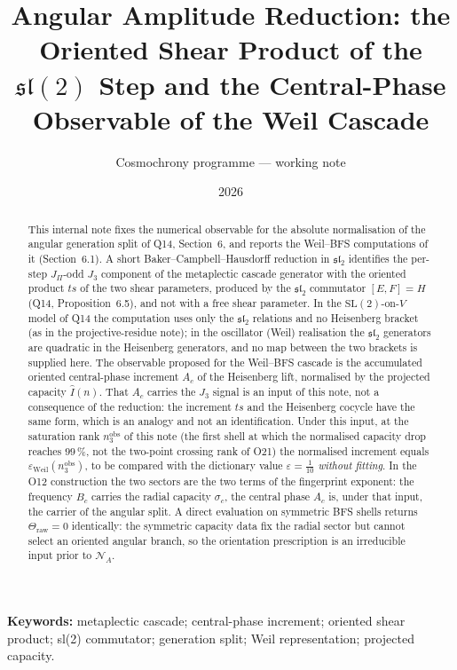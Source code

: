 \documentclass[11pt]{article}
\title{Angular Amplitude Reduction:
the Oriented Shear Product of the $\mathfrak{sl}(2)$ Step
and the Central-Phase Observable of the Weil Cascade}
\author{Cosmochrony programme --- working note}
\date{2026}
\providecommand{\Ihat}{\widehat{I}}
\begin{document}
  \maketitle

  \begin{abstract}
    This internal note fixes the numerical observable for the absolute normalisation of the angular
    generation split of Q14, Section~6, and reports the Weil--BFS computations of it
    (Section~6.1).
    A short Baker--Campbell--Hausdorff reduction in $\mathfrak{sl}_2$ identifies the per-step $J_\Pi$-odd $J_3$
    component of the metaplectic cascade generator with the oriented product $ts$ of the two shear parameters,
    produced by the $\mathfrak{sl}_2$ commutator $[E,F]=H$ (Q14, Proposition~6.5), and not with a free shear
    parameter.
    In the $\mathrm{SL}(2)$-on-$V$ model of Q14 the computation uses only the $\mathfrak{sl}_2$ relations and no
    Heisenberg bracket (as in the projective-residue note); in the oscillator (Weil) realisation the $\mathfrak{sl}_2$ generators are
    quadratic in the Heisenberg generators, and no map between the two brackets is supplied here.
    The observable proposed for the Weil--BFS cascade is the accumulated oriented central-phase increment
    $A_c$ of the Heisenberg lift, normalised by the projected capacity $\Ihat(n)$.
    That $A_c$ carries the $J_3$ signal is an input of this note, not a consequence of the reduction: the
    increment $ts$ and the Heisenberg cocycle have the same form, which is an analogy and not an identification.
    Under this input, at the saturation rank $n_3^{\mathrm{obs}}$ of this note (the first shell at which the
    normalised capacity drop reaches $99\,\%$, not the two-point crossing rank of O21) the normalised
    increment equals $\varepsilon_{\mathrm{Weil}}(n_3^{\mathrm{obs}})$, to be
    compared with the dictionary value $\varepsilon = \tfrac{1}{10}$ \emph{without fitting}.
    In the O12 construction the two sectors are the two terms of the fingerprint exponent: the frequency
    $B_c$ carries the radial capacity $\sigma_c$, the central phase $A_c$ is, under that input, the carrier of the angular split.
    A direct evaluation on symmetric BFS shells returns $\Theta_{\mathrm{raw}}=0$ identically: the
    symmetric capacity data fix the radial sector but cannot select an oriented angular branch, so the
    orientation prescription is an irreducible input prior to $\mathcal{N}_A$.
  \end{abstract}

  \textbf{Keywords:} metaplectic cascade; central-phase increment; oriented shear product; sl(2) commutator;
  generation split; Weil representation; projected capacity.
\end{document}
